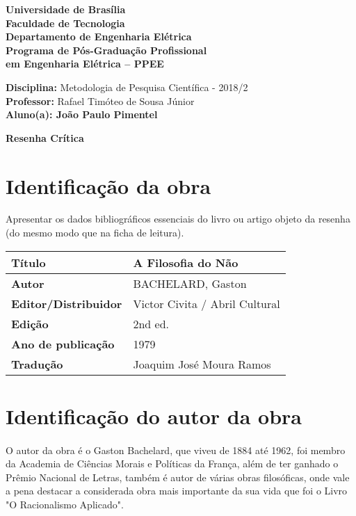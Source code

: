 \documentclass[11pt]{article}
\begin{document}
\noindent
\begin{center}
	\Large\textbf{Universidade de Brasília}\\
	\Large\textbf{Faculdade de Tecnologia}\\
	\Large\textbf{Departamento de Engenharia Elétrica}\\
	\Large\textbf{Programa de Pós-Graduação Profissional \\
		em Engenharia Elétrica -- PPEE}\\
\end{center}

\large{
	\noindent
	\textbf{Disciplina:} Metodologia de Pesquisa Científica - 2018/2\\
	\textbf{Professor:} Rafael Timóteo de Sousa Júnior \\
	\textbf{Aluno(a): João Paulo Pimentel}}\\

\begin{center}
\Large\textbf{Resenha Crítica}
\end{center}
\normalsize

\section{Identificação da obra}
    Apresentar os dados bibliográficos essenciais do livro ou artigo objeto da resenha (do mesmo modo que na ficha de leitura).

\begin{center}
	\begin{tabular}{|l|l|} \hline
		\textbf{Título} & A Filosofia do Não\cite{Bachelard1979} \\ \hline
		\textbf{Autor} & BACHELARD, Gaston \\ \hline
		\textbf{Editor/Distribuidor} & Victor Civita / Abril Cultural
 \\ \hline
		\textbf{Edição} & 2nd ed. \\ \hline
		\textbf{Ano de publicação} & 1979 \\ \hline
		\textbf{Tradução} &  Joaquim José Moura Ramos \\ \hline
	\end{tabular}
\end{center}

\section{Identificação do autor da obra}

\paragraph{}
    O autor da obra é o Gaston Bachelard, que viveu de 1884 até 1962, foi membro da Academia de Ciências Morais e Políticas da França, além de ter ganhado o Prêmio Nacional de Letras, também é autor de várias obras filosóficas, onde vale a pena destacar a considerada obra mais importante da sua vida que foi o Livro "O Racionalismo Aplicado".
\end{document}
